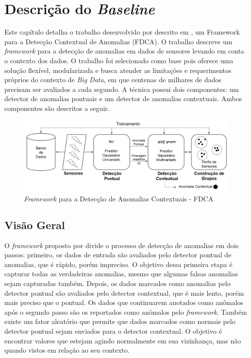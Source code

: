 \documentclass[cic,tc]{iiufrgs}
\begin{document}
\chapter{Descrição do \textit{Baseline}}
\label{cap_baseline}
Este capítulo detalha o trabalho desenvolvido por \citeauthor{ContextualMichael2014} descrito em \cite{ContextualMichael2014}, um Framework para a Detecção Contextual de Anomalias (FDCA). O trabalho descreve um \textit{framework} para a detecção de anomalias em dados de sensores levando em conta o contexto dos dados. O trabalho foi selecionado como base pois oferece uma solução flexível, modularizada e busca atender as limitações e requerimentos próprios do contexto de \textit{Big Data}, em que centenas de milhares de dados precisam ser avaliados a cada segundo. A técnica possui dois componentes: um detector de anomalias pontuais e um detector de anomalias contextuais. Ambos componentes são descritos a seguir.


\begin{figure}
	\caption{\textit{Framework} para a Detecção de Anomalias Contextuais - FDCA}
	\bigskip
		\begin{center}
			\includegraphics[width=1\textwidth]{CADF.PNG}
		\end{center}
	\label{cadf_arq}
\end{figure}


\section{Visão Geral}
O \textit{framework} proposto por \cite{ContextualMichael2014} divide o processo de detecção de anomalias em dois passos: primeiro, os dados de entrada são avaliados pelo detector pontual de anomalias, que é rápido, porém impreciso. O objetivo dessa primeira etapa é capturar todas as verdadeiras anomalias, mesmo que algumas falsas anomalias sejam capturadas também. Depois, os dados marcados como anomalias pelo detector pontual são avaliados pelo detector contextual, que é mais lento, porém mais preciso que o pontual. Os dados que continuarem anotados como anômalos após o segundo passo são os reportados como anômalos pelo \textit{framework}. Também existe um fator aleatório que permite que dados marcados como normais pelo detector pontual sejam enviados para o detector contextual. O objetivo é encontrar valores que estejam agindo normalmente em sua vizinhança, mas não quando vistos em relação ao seu contexto. 
\end{document}

